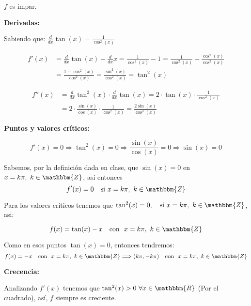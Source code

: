 \documentclass[12pt]{article}
\begin{document}
\begin{enumerate}[\hspace{9px} a)]
            $f$ es impar.\bigskip

        \textbf{Derivadas: }\medskip

            Sabiendo que: \(\displaystyle\frac{d}{dx}\tan(x) = \displaystyle\frac{1}{\cos^2(x)}\)

            \begin{align*}
                f'(x) &= \frac{d}{dx}\tan(x) - \frac{d}{dx}x = \frac{1}{\cos^2(x)} - 1 = \frac{1}{\cos^2(x)} - \frac{\cos^2(x)}{\cos^2(x)} \\
                &= \frac{1-\cos^2(x)}{\cos^2(x)} = \frac{\sin^2(x)}{\cos^2(x)} = \tan^2(x)
            \end{align*}

            \begin{align*}
                f''(x) &= \frac{d}{dx}\tan^2(x)\cdot\frac{d}{dx}\tan(x) = 2\cdot\tan(x)\cdot\frac{1}{\cos^2(x)} \\
                &= 2\cdot\frac{\sin(x)}{\cos(x)}\cdot\frac{1}{\cos^2(x)} = \frac{2\sin(x)}{\cos^3(x)}
            \end{align*}
            
        \textbf{Puntos y valores cr\'iticos: }\medskip

            \begin{equation*}
                f'(x)=0 \Longrightarrow \tan^2(x)=0 \Longrightarrow \frac{\sin(x)}{\cos(x)}=0 \Longrightarrow \sin(x)=0
            \end{equation*}

            Sabemos, por la definici\'on dada en clase, que \(\sin(x)=0\) en \(x=k\pi, \ k\in\mathbbm{Z}\), as\'i entonces 
            \[f'(x)=0 \quad \text{si} \ x=k\pi, \ k\in\mathbbm{Z}\]

            Para los valores cr\'iticos tenemos que \(\tan^2(x)=0, \quad \text{si} \ x=k\pi, \ k\in\mathbbm{Z}\), asi:

            \begin{equation*}
                f(x) = \tan(x)-x \quad \text{con } \  x=k\pi, \ k\in\mathbbm{Z}
            \end{equation*}

            Como en esos puntos \(\tan(x)=0\), entonces tendremos: \[f(x)=-x \quad \text{con } \  x=k\pi, \ k\in\mathbbm{Z} \Longrightarrow (k\pi,-k\pi) \quad \text{con } \  x=k\pi, \ k\in\mathbbm{Z}\]

        \textbf{Crecencia: }\medskip

            Analizando \(f'(x)\) tenemos que \(\tan^2(x)>0 \ \forall x\in\mathbbm{R}\) (Por el cuadrado), as\'i, $f$ siempre es creciente.


\end{enumerate}
\end{document}

